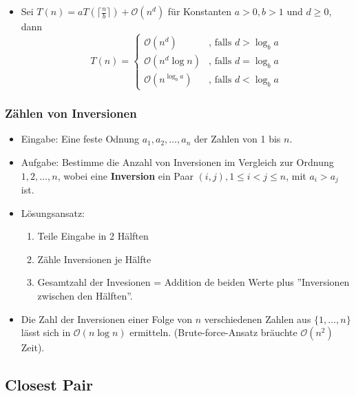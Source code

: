 \documentclass{scrartcl}
\begin{document}
\begin{itemize}
	\item Sei $ T(n) = aT(\lceil \frac{n}{b} \rceil) + \mathcal{O}(n^d)  $ für Konstanten $ a > 0, b > 1 $ und $ d \geq 0 $, dann
	\[ T(n) = \begin{cases}
		\mathcal{O}(n^d) & \text{, falls } d > \log_b a \\
		\mathcal{O}(n^d \log n) & \text{, falls } d = \log_b a \\
		\mathcal{O}(n^{\log_b a}) & \text{, falls } d < \log_b a
	\end{cases} \]
\end{itemize}

\subsubsection{Zählen von Inversionen}

\begin{itemize}
	\item Eingabe: Eine feste Odnung $ a_1,a_2,\ldots,a_n $ der Zahlen von 1 bis $ n $.
	\item Aufgabe: Bestimme die Anzahl von Inversionen im Vergleich zur Ordnung $ 1,2,\ldots,n $, wobei eine \textbf{Inversion} ein Paar $ (i,j), 1 \leq i < j \leq n $, mit $ a_i > a_j $ ist.
	\item Lösungsansatz:
	\begin{enumerate}
		\item Teile Eingabe in 2 Hälften
		\item Zähle Inversionen je Hälfte
		\item Gesamtzahl der Invesionen = Addition de beiden Werte plus ''Inversionen zwischen den Hälften''.
	\end{enumerate}
	\item Die Zahl der Inversionen einer Folge von $ n $ verschiedenen Zahlen aus $ \{ 1,\ldots,n \} $ lässt sich in $ \mathcal{O}(n \log n) $ ermitteln. (Brute-force-Ansatz bräuchte $ \mathcal{O}(n^2) $ Zeit).
\end{itemize}

\subsection{Closest Pair}
\end{document}
